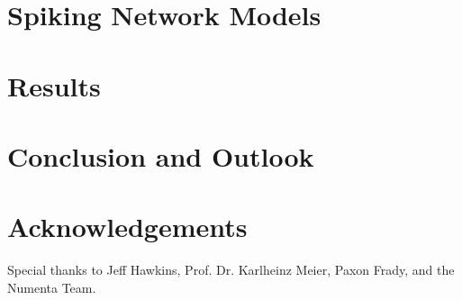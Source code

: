 \documentclass{reporter}
\begin{document}
\section{Spiking Network Models}


\section{Results}


\section{Conclusion and Outlook}


\section*{Acknowledgements}

Special thanks to Jeff Hawkins, Prof. Dr. Karlheinz Meier, Paxon Frady,
and the Numenta Team.



%
%
%
%
%
%
%
\end{document}
